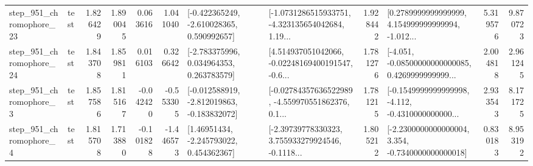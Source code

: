 \begin{tabular}{llrrrrllrlrr}
  step\_951\_chromophore\_23 &      test &      1.826429 &    1.890045 &      0.063616 &  1.041040 &   [-0.422365249, -2.610028365, 0.590992657] &  [-1.0731286515933751, -4.323135654042684, 1.19... &       1.928442 &  [0.2789999999999999, 4.154999999999994, -1.012... &            5.319576 &          9.870723 \\
  step\_951\_chromophore\_24 &      test &      1.843708 &    1.859811 &      0.016103 &  0.326642 &    [-2.783375996, 0.034964353, 0.263783579] &  [4.514937051042066, -0.02248169400191547, -0.6... &       1.781276 &  [-4.051, -0.08500000000000085, 0.4269999999999... &            2.004818 &          2.961245 \\
   step\_951\_chromophore\_3 &      test &      1.857586 &    1.815167 &     -0.042420 & -0.553305 &  [-0.012588919, -2.812019863, -0.183832072] &  [-0.02784357636522989, -4.559970551862376, 0.1... &       1.781215 &  [-0.1549999999999998, -4.112, -0.4310000000000... &            2.933543 &          8.171725 \\
   step\_951\_chromophore\_4 &      test &      1.815708 &    1.713880 &     -0.101828 & -1.446573 &     [1.46951434, -2.245793022, 0.454362367] &  [-2.39739778330323, 3.755933279924546, -0.1118... &       1.805212 &  [-2.2300000000000004, 3.354, -0.7340000000000018] &            0.830183 &          8.953192 \\
\bottomrule
\end{tabular}

